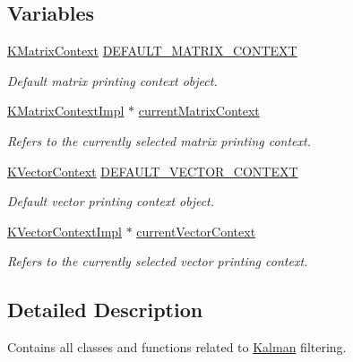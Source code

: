 \subsection*{Variables}
\begin{DoxyCompactItemize}
\item 
\mbox{\label{namespaceKalman_a7aae55f474b3e41f05857eda59222d6b}} 
\mbox{\hyperlink{namespaceKalman_a7c967f82c4d1bd0565bf8ce864a32fa2}{K\+Matrix\+Context}} \mbox{\hyperlink{namespaceKalman_a7aae55f474b3e41f05857eda59222d6b}{D\+E\+F\+A\+U\+L\+T\+\_\+\+M\+A\+T\+R\+I\+X\+\_\+\+C\+O\+N\+T\+E\+XT}}
\begin{DoxyCompactList}\small\item\em Default matrix printing context object. \end{DoxyCompactList}\item 
\mbox{\hyperlink{classKalman_1_1KMatrixContextImpl}{K\+Matrix\+Context\+Impl}} $\ast$ \mbox{\hyperlink{namespaceKalman_a444b513293121a06533af4a9779a6077}{current\+Matrix\+Context}}
\begin{DoxyCompactList}\small\item\em Refers to the currently selected matrix printing context. \end{DoxyCompactList}\item 
\mbox{\label{namespaceKalman_a3378d9c184fd825052b9e4b5af3448a2}} 
\mbox{\hyperlink{namespaceKalman_a754bbcbae0bf32d47b585116e5d91967}{K\+Vector\+Context}} \mbox{\hyperlink{namespaceKalman_a3378d9c184fd825052b9e4b5af3448a2}{D\+E\+F\+A\+U\+L\+T\+\_\+\+V\+E\+C\+T\+O\+R\+\_\+\+C\+O\+N\+T\+E\+XT}}
\begin{DoxyCompactList}\small\item\em Default vector printing context object. \end{DoxyCompactList}\item 
\mbox{\hyperlink{classKalman_1_1KVectorContextImpl}{K\+Vector\+Context\+Impl}} $\ast$ \mbox{\hyperlink{namespaceKalman_af090011bfb067058e8072658f8b3d66c}{current\+Vector\+Context}}
\begin{DoxyCompactList}\small\item\em Refers to the currently selected vector printing context. \end{DoxyCompactList}\end{DoxyCompactItemize}


\subsection{Detailed Description}
Contains all classes and functions related to \mbox{\hyperlink{namespaceKalman}{Kalman}} filtering. 

